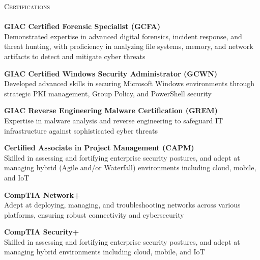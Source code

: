 \documentclass[a4paper]{article}
\newcommand{\lineunder} {
        \vspace*{-8pt} \\
        \hspace*{-18pt} \hrulefill \\
    }
\newcommand{\header} [1] {
        {\hspace*{-18pt}\vspace*{6pt} \textsc{#1}}
        \vspace*{-6pt} \lineunder
    }
\begin{document}
    \header{Certifications}
    
            {\textbf{GIAC Certified Forensic Specialist (GCFA)}}\\
            Demonstrated expertise in advanced digital forensics, incident response, and threat hunting, with proficiency in analyzing file systems, memory, and network artifacts to detect and mitigate cyber threats\\
            \vspace*{2mm}
            
            {\textbf{GIAC Certified Windows Security Administrator (GCWN)}}\\
            Developed advanced skills in securing Microsoft Windows environments through strategic PKI management, Group Policy, and PowerShell security\\
            \vspace*{2mm}
            
            {\textbf{GIAC Reverse Engineering Malware Certification (GREM)}}\\
            Expertise in malware analysis and reverse engineering to safeguard IT infrastructure against sophisticated cyber threats\\
            \vspace*{2mm}
            
            {\textbf{Certified Associate in Project Management (CAPM)}}\\
            Skilled in assessing and fortifying enterprise security postures, and adept at managing hybrid (Agile and/or Waterfall) environments including cloud, mobile, and IoT\\
            \vspace*{2mm}
            
            {\textbf{CompTIA Network+}}\\
            Adept at deploying, managing, and troubleshooting networks across various platforms, ensuring robust connectivity and cybersecurity\\
            \vspace*{2mm}
            
            {\textbf{CompTIA Security+}}\\
            Skilled in assessing and fortifying enterprise security postures, and adept at managing hybrid environments including cloud, mobile, and IoT\\
            \vspace*{2mm}
            
\end{document}
